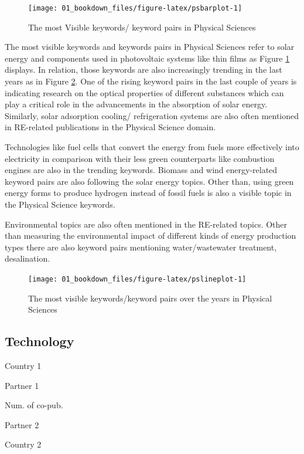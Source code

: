 \documentclass[
]{book}
\begin{document}
\begin{figure}
\texttt{[image: 01\_bookdown\_files/figure-latex/psbarplot-1]} \caption{The most Visible keywords/ keyword pairs in Physical Sciences}\label{fig:psbarplot}
\end{figure}

The most visible keywords and keywords pairs in Physical Sciences refer to solar energy and components used in photovoltaic systems like thin films as Figure \ref{fig:psbarplot} displays. In relation, those keywords are also increasingly trending in the last years as in Figure \ref{fig:pslineplot}. One of the rising keyword pairs in the last couple of years is indicating research on the optical properties of different substances which can play a critical role in the advancements in the absorption of solar energy. Similarly, solar adsorption cooling/ refrigeration systems are also often mentioned in RE-related publications in the Physical Science domain.

Technologies like fuel cells that convert the energy from fuels more effectively into electricity in comparison with their less green counterparts like combustion engines are also in the trending keywords. Biomass and wind energy-related keyword pairs are also following the solar energy topics. Other than, using green energy forms to produce hydrogen instead of fossil fuels is also a visible topic in the Physical Science keywords.

Environmental topics are also often mentioned in the RE-related topics. Other than measuring the environmental impact of different kinds of energy production types there are also keyword pairs mentioning water/wastewater treatment, desalination.

\begin{figure}
\texttt{[image: 01\_bookdown\_files/figure-latex/pslineplot-1]} \caption{The most visible keywords/keyword pairs over the years in Physical Sciences}\label{fig:pslineplot}
\end{figure}

\hypertarget{technology}{%
\subsection{Technology}\label{technology}}

Country 1

Partner 1

Num. of co-pub.

Partner 2

Country 2
\end{document}
